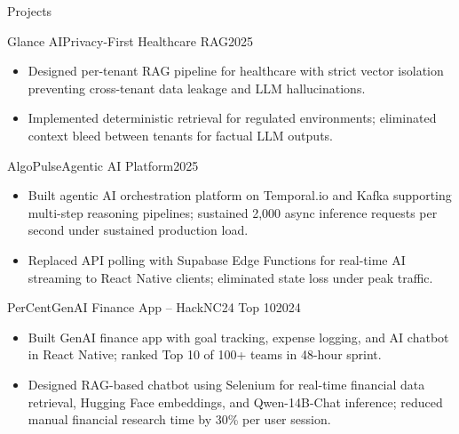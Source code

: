 \documentclass[]{mcdowellcv}
\begin{document}
\begin{cvsection}{Projects}
  \begin{cvsubsection}{Glance AI}{Privacy-First Healthcare RAG}{2025}
    \begin{itemize}
      \item Designed per-tenant RAG pipeline for healthcare with strict vector isolation preventing cross-tenant data leakage and LLM hallucinations.
      \item Implemented deterministic retrieval for regulated environments; eliminated context bleed between tenants for factual LLM outputs.
    \end{itemize}
    \vspace{-1.5pt}
  \end{cvsubsection}

  \begin{cvsubsection}{AlgoPulse}{Agentic AI Platform}{2025}
    \begin{itemize}
      \item Built agentic AI orchestration platform on Temporal.io and Kafka supporting multi-step reasoning pipelines; sustained 2,000 async inference requests per second under sustained production load.
      \item Replaced API polling with Supabase Edge Functions for real-time AI streaming to React Native clients; eliminated state loss under peak traffic.
    \end{itemize}
    \vspace{-1.5pt}
  \end{cvsubsection}

  \begin{cvsubsection}{PerCent}{GenAI Finance App -- HackNC24 Top 10}{2024}
    \begin{itemize}
      \item Built GenAI finance app with goal tracking, expense logging, and AI chatbot in React Native; ranked Top 10 of 100+ teams in 48-hour sprint.
      \item Designed RAG-based chatbot using Selenium for real-time financial data retrieval, Hugging Face embeddings, and Qwen-14B-Chat inference; reduced manual financial research time by 30\% per user session.
    \end{itemize}
    \vspace{-1.5pt}
  \end{cvsubsection}

\end{cvsection}
\end{document}
